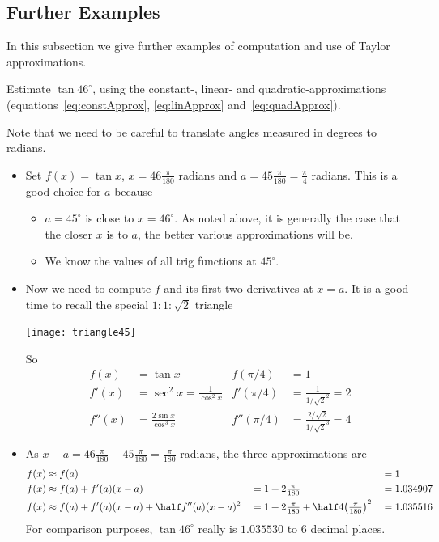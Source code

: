 \subsection{Further Examples}\label{ssec_taylor_more}
In this subsection we give further examples of computation and use of Taylor
approximations.

\begin{eg}\label{eg:taylorapprox}
Estimate $\tan 46^\circ$, using the constant-, linear- and quadratic-approximations
(equations~\eqref{eq:constApprox}, \eqref{eq:linApprox} and~\eqref{eq:quadApprox}).

\soln Note that we need to be careful to translate angles measured in degrees to radians.
\begin{itemize}
 \item Set $f(x)=\tan x$, $x=46\tfrac{\pi}{180}$ radians
and $a=45\tfrac{\pi}{180}=\tfrac{\pi}{4}$ radians.
This is a good choice for $a$ because
\begin{itemize}
\item  $a=45^\circ$ is close to $x=46^\circ$. As noted above, it is generally the case
that the closer $x$ is to $a$, the better various approximations will be.
\item We know the values of all trig functions at $45^\circ$.
\end{itemize}
\item Now we need to compute $f$ and its first two derivatives at $x=a$. It is a good
time to recall the special $1:1:\sqrt{2}$ triangle
\begin{efig}
 \begin{center}
  \texttt{[image: triangle45]}
 \end{center}
\end{efig}
So
\begin{align*}
  f(x) &= \tan x & f(\pi/4) &= 1\\
%
  f'(x) &= \sec^2 x = \frac{1}{\cos^2 x}
  & f'(\pi/4) &= \frac{1}{1/\sqrt{2}^2} = 2 \\
%
  f''(x) &=  \frac{2\sin x}{\cos^3 x}
  & f''(\pi/4) &= \frac{2/\sqrt{2}}{1/\sqrt{2}^3} = 4
\end{align*}
\item As $x-a=46\tfrac{\pi}{180}-45\tfrac{\pi}{180}=\tfrac{\pi}{180}$ radians, the
three approximations are
\begin{alignat*}{3}
f(x)&\approx f(a) &
    &&&=1\\
f(x)&\approx f(a)+f'(a)(x-a) &
    &=1+2\tfrac{\pi}{180} &
    &=1.034907\\
f(x)&\approx f(a)+f'(a)(x-a)+\half f''(a)(x-a)^2&
    &=1+2\tfrac{\pi}{180}+\half 4\big(\tfrac{\pi}{180}\big)^2 &
    & =1.035516
\end{alignat*}
For comparison purposes, $\tan 46^\circ$ really is $1.035530$ to 6 decimal
places.

\end{itemize}

\end{eg}

